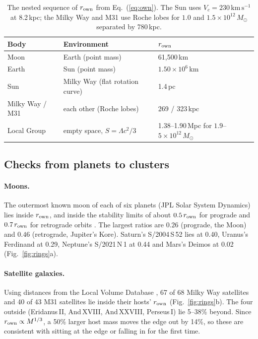 \documentclass[11pt]{article}
\newcommand{\unit}[1]{\,\mathrm{#1}}
\begin{document}
\begin{table}[t]
\centering
\caption{The nested sequence of $r_{\rm own}$ from Eq.~(\ref{eq:own}). The Sun uses $V_c=230\unit{km\,s^{-1}}$ at 8.2\,kpc; the Milky Way and M31 use Roche lobes for $1.0$ and $1.5\times10^{12}\,M_\odot$ separated by 780\,kpc.}
\label{tab:ladder}
\small
\begin{tabular}{@{}lll@{}}
\toprule
Body & Environment & $r_{\rm own}$ \\
\midrule
Moon & Earth (point mass) & 61{,}500\,km \\
Earth & Sun (point mass) & $1.50\times10^6$\,km \\
Sun & Milky Way (flat rotation curve) & 1.4\,pc \\
Milky Way / M31 & each other (Roche lobes) & 269 / 323\,kpc \\
Local Group & empty space, $S=\Lambda c^2/3$ & 1.38--1.90\,Mpc for $1.9$--$5\times10^{12}\,M_\odot$ \\
\bottomrule
\end{tabular}
\end{table}

\subsection{Checks from planets to clusters}

\paragraph{Moons.} The outermost known moon of each of six planets (JPL Solar System Dynamics) lies inside $r_{\rm own}$, and inside the stability limits of about $0.5\,r_{\rm own}$ for prograde and $0.7\,r_{\rm own}$ for retrograde orbits \citep{HamiltonKrivov1997}. The largest ratios are $0.26$ (prograde, the Moon) and $0.46$ (retrograde, Jupiter's Kore). Saturn's S/2004\,S\,52 lies at 0.40, Uranus's Ferdinand at 0.29, Neptune's S/2021\,N\,1 at 0.44 and Mars's Deimos at 0.02 (Fig.~\ref{fig:rings}a).

\paragraph{Satellite galaxies.} Using distances from the Local Volume Database \citep{Pace2024}, 67 of 68 Milky Way satellites and 40 of 43 M31 satellites lie inside their hosts' $r_{\rm own}$ (Fig.~\ref{fig:rings}b). The four outside (Eridanus\,II, And\,XVIII, And\,XXVIII, Perseus\,I) lie 5--38\% beyond. Since $r_{\rm own}\propto M^{1/3}$, a 50\% larger host mass moves the edge out by 14\%, so these are consistent with sitting at the edge or falling in for the first time.
\end{document}
